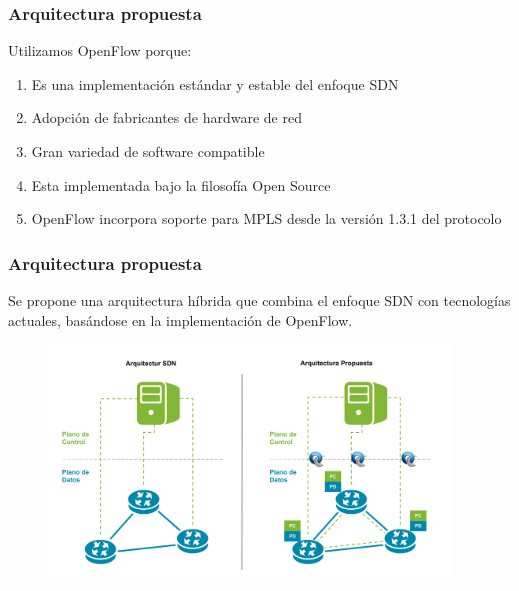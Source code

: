 \documentclass{beamer}
\begin{document}
\begin{frame}
\frametitle{Arquitectura propuesta} 

Utilizamos OpenFlow porque:

\begin{enumerate}[<+->]
\item Es una implementaci\'on estándar y estable del enfoque SDN
\item Adopci\'on de fabricantes de hardware de red
\item Gran variedad de software compatible
\item Esta implementada bajo la filosofía Open Source
\item OpenFlow incorpora soporte para MPLS desde la versi\'on 1.3.1 del protocolo
\end{enumerate}

\end{frame}

\begin{frame}
\frametitle{Arquitectura propuesta} 

Se propone una arquitectura h\'ibrida que combina el enfoque SDN con tecnologías actuales, basándose 
en la implementaci\'on de OpenFlow.

\begin{figure}[H]
\centering
\includegraphics[width=0.95\textwidth, left]{imagenes/arquitecturapropuesta.png}
\end{figure}

\end{frame}
\end{document}
